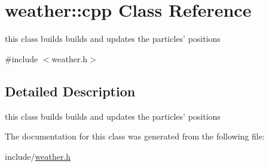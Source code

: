 \hypertarget{classweather_1_1cpp}{
\section{weather::cpp Class Reference}
\label{classweather_1_1cpp}
}


this class builds builds and updates the particles' positions  


{\ttfamily \#include $<$weather.h$>$}

\subsection{Detailed Description}
this class builds builds and updates the particles' positions 

The documentation for this class was generated from the following file:\begin{DoxyCompactItemize}
\item 
include/\hyperlink{weather_8h}{weather.h}\end{DoxyCompactItemize}
